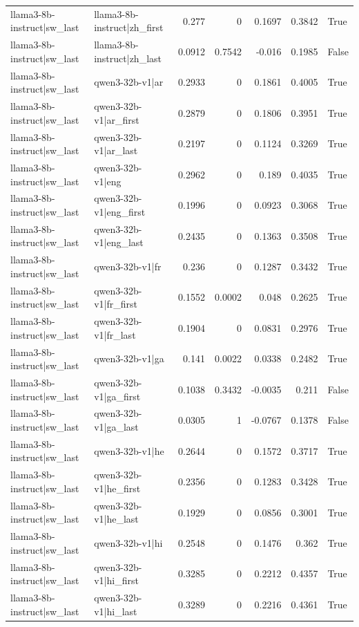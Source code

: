 \begin{table}
\begin{tabular}{l l r r r r l}
llama3-8b-instruct|sw_last & llama3-8b-instruct|zh_first & 0.277 & 0 & 0.1697 & 0.3842 & True \\
llama3-8b-instruct|sw_last & llama3-8b-instruct|zh_last & 0.0912 & 0.7542 & -0.016 & 0.1985 & False \\
llama3-8b-instruct|sw_last & qwen3-32b-v1|ar & 0.2933 & 0 & 0.1861 & 0.4005 & True \\
llama3-8b-instruct|sw_last & qwen3-32b-v1|ar_first & 0.2879 & 0 & 0.1806 & 0.3951 & True \\
llama3-8b-instruct|sw_last & qwen3-32b-v1|ar_last & 0.2197 & 0 & 0.1124 & 0.3269 & True \\
llama3-8b-instruct|sw_last & qwen3-32b-v1|eng & 0.2962 & 0 & 0.189 & 0.4035 & True \\
llama3-8b-instruct|sw_last & qwen3-32b-v1|eng_first & 0.1996 & 0 & 0.0923 & 0.3068 & True \\
llama3-8b-instruct|sw_last & qwen3-32b-v1|eng_last & 0.2435 & 0 & 0.1363 & 0.3508 & True \\
llama3-8b-instruct|sw_last & qwen3-32b-v1|fr & 0.236 & 0 & 0.1287 & 0.3432 & True \\
llama3-8b-instruct|sw_last & qwen3-32b-v1|fr_first & 0.1552 & 0.0002 & 0.048 & 0.2625 & True \\
llama3-8b-instruct|sw_last & qwen3-32b-v1|fr_last & 0.1904 & 0 & 0.0831 & 0.2976 & True \\
llama3-8b-instruct|sw_last & qwen3-32b-v1|ga & 0.141 & 0.0022 & 0.0338 & 0.2482 & True \\
llama3-8b-instruct|sw_last & qwen3-32b-v1|ga_first & 0.1038 & 0.3432 & -0.0035 & 0.211 & False \\
llama3-8b-instruct|sw_last & qwen3-32b-v1|ga_last & 0.0305 & 1 & -0.0767 & 0.1378 & False \\
llama3-8b-instruct|sw_last & qwen3-32b-v1|he & 0.2644 & 0 & 0.1572 & 0.3717 & True \\
llama3-8b-instruct|sw_last & qwen3-32b-v1|he_first & 0.2356 & 0 & 0.1283 & 0.3428 & True \\
llama3-8b-instruct|sw_last & qwen3-32b-v1|he_last & 0.1929 & 0 & 0.0856 & 0.3001 & True \\
llama3-8b-instruct|sw_last & qwen3-32b-v1|hi & 0.2548 & 0 & 0.1476 & 0.362 & True \\
llama3-8b-instruct|sw_last & qwen3-32b-v1|hi_first & 0.3285 & 0 & 0.2212 & 0.4357 & True \\
llama3-8b-instruct|sw_last & qwen3-32b-v1|hi_last & 0.3289 & 0 & 0.2216 & 0.4361 & True \\

\end{tabular}
\end{table}
